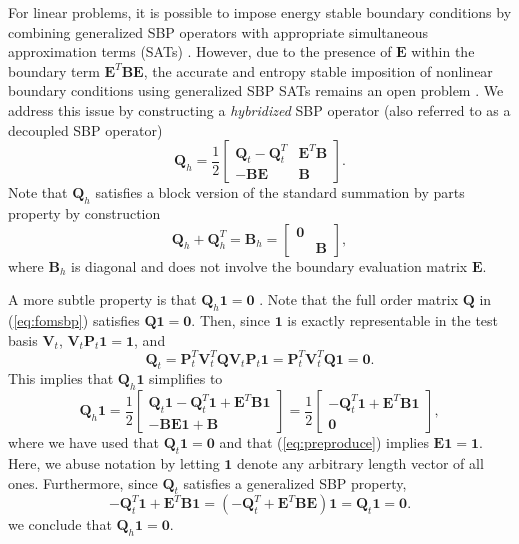 \documentclass[preprint,10pt]{elsarticle}
\theoremstyle{definition}
\theoremstyle{lemma}
\theoremstyle{theorem}
\theoremstyle{assumption}
\newcommand{\LRp}[1]{\left( #1 \right)}
\begin{document}
For linear problems, it is possible to impose energy stable boundary conditions by combining generalized SBP operators with appropriate simultaneous approximation terms (SATs) \cite{fernandez2018simultaneous}.  However, due to the presence of $\bm{E}$ within the boundary term $\bm{E}^T\bm{B}\bm{E}$, the accurate and entropy stable imposition of nonlinear boundary conditions using generalized SBP SATs remains an open problem \cite{crean2018entropy, chan2018efficient, chenreview}. We address this issue by constructing a \textit{hybridized} SBP operator (also referred to as a decoupled SBP operator) \cite{chan2017discretely, chan2019skew}
\[
\bm{Q}_{h} = \frac{1}{2}\begin{bmatrix}
\bm{Q}_t - \bm{Q}_t^T & \bm{E}^T\bm{B} \\
-\bm{B}\bm{E} & \bm{B}
\end{bmatrix}.
\]
Note that $\bm{Q}_h$ satisfies a block version of the standard summation by parts property by construction
\[
\bm{Q}_h + \bm{Q}_h^T = \bm{B}_h = \begin{bmatrix}
\bm{0} & \\
& \bm{B} \end{bmatrix},  
\]
where $\bm{B}_h$ is diagonal and does not involve the boundary evaluation matrix $\bm{E}$.  

A more subtle property is that $\bm{Q}_h\bm{1} = \bm{0}$ \cite{chan2019skew}.  Note that the full order matrix $\bm{Q}$ in (\ref{eq:fomsbp}) satisfies $\bm{Q}\bm{1} = \bm{0}$.  Then, since $\bm{1}$ is exactly representable in the test basis $\bm{V}_t$, $\bm{V}_t\bm{P}_t\bm{1} = \bm{1}$, and
\[
\bm{Q}_t = \bm{P}_t^T\bm{V}_t^T\bm{Q}\bm{V}_t\bm{P}_t\bm{1} = \bm{P}_t^T\bm{V}_t^T\bm{Q}\bm{1} = \bm{0}.
\]
This implies that $\bm{Q}_h\bm{1}$ simplifies to
\[
\bm{Q}_h \bm{1} =  \frac{1}{2}\begin{bmatrix}
\bm{Q}_t \bm{1} - \bm{Q}_t^T \bm{1} + \bm{E}^T\bm{B} \bm{1} \\
- \bm{B}\bm{E} \bm{1} + \bm{B}
\end{bmatrix}=\frac{1}{2}\begin{bmatrix}
- \bm{Q}_t^T \bm{1} + \bm{E}^T\bm{B} \bm{1} \\
\bm{0}
\end{bmatrix},
\]
where we have used that $\bm{Q}_t\bm{1} = \bm{0}$ and that (\ref{eq:preproduce}) implies $\bm{E}\bm{1} = \bm{1}$.   Here, we abuse notation by letting $\bm{1}$ denote any arbitrary length vector of all ones.  Furthermore, since $\bm{Q}_t$ satisfies a generalized SBP property,
\[
- \bm{Q}_t^T \bm{1} + \bm{E}^T\bm{B} \bm{1} = \LRp{-\bm{Q}_t^T + \bm{E}^T\bm{B}\bm{E}} \bm{1} = \bm{Q}_t \bm{1} = \bm{0}.
\]
we conclude that $\bm{Q}_h\bm{1} = \bm{0}$.
\end{document}
